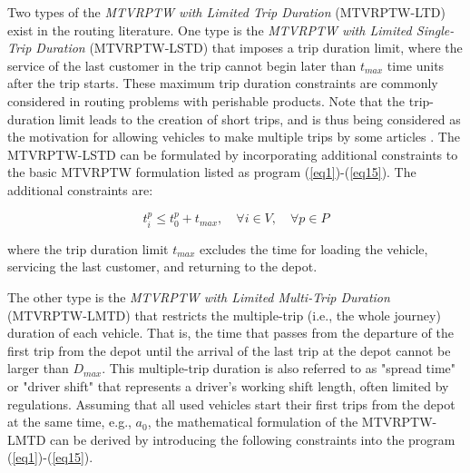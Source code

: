 Two types of the \textit{MTVRPTW with Limited Trip Duration} (MTVRPTW-LTD) exist in the routing literature.  One type is the \textit{MTVRPTW with Limited Single-Trip Duration} (MTVRPTW-LSTD) that imposes a trip duration limit, where the service of the last customer in the trip cannot begin later than $t_{max}$ time units after the trip starts.  These maximum trip duration constraints are commonly considered in routing problems with perishable products.  Note that the trip-duration limit leads to the creation of short trips, and is thus being considered as the motivation for allowing vehicles to make multiple trips by some articles \citep[e.g.,][]{azi2010exact, azi2014adaptive}.  The MTVRPTW-LSTD can be formulated by incorporating additional constraints to the basic MTVRPTW formulation listed as program (\ref{eq1})-(\ref{eq15}).  The additional constraints are:

\begin{equation} \label{eq23}
    t^p_i \leq t^p_0 + t_{max}, \quad \forall i \in V, \quad \forall p \in P
\end{equation}

where the trip duration limit $t_{max}$ excludes the time for loading the vehicle, servicing the last customer, and returning to the depot.
\newline


The other type is the \textit{MTVRPTW with Limited Multi-Trip Duration} (MTVRPTW-LMTD) that restricts the multiple-trip (i.e., the whole journey) duration of each vehicle.  That is, the time that passes from the departure of the first trip from the depot until the arrival of the last trip at the depot cannot be larger than $D_{max}$.  This multiple-trip duration is also referred to as "spread time" \citep[e.g.,][]{battarra2009adaptive, wang2014metaheuristic, karoonsoontawong2015efficient, cattaruzza2016vehicle} or "driver shift" \citep[e.g.,][]{franccois2019adaptive} that represents a driver's working shift length, often limited by regulations.  Assuming that all used vehicles start their first trips from the depot at the same time, e.g., $a_0$, the mathematical formulation of the MTVRPTW-LMTD can be derived by introducing the following constraints into the program (\ref{eq1})-(\ref{eq15}).


